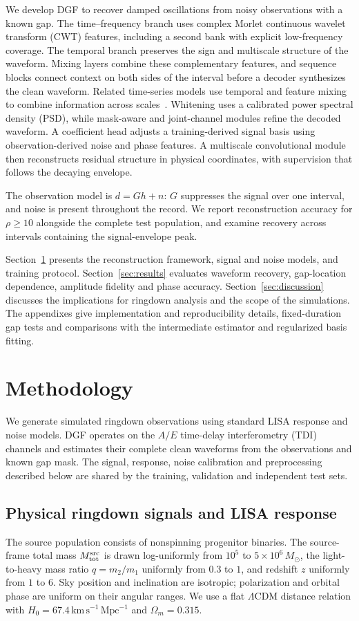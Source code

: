 \documentclass[10pt,prd,aps,a4paper,twocolumn,superscriptaddress,nofootinbib,floatfix]{revtex4-2}
\begin{document}
We develop DGF to recover damped oscillations from noisy observations with a known gap. The time--frequency branch uses complex Morlet continuous wavelet transform (CWT) features, including a second bank with explicit low-frequency coverage. The temporal branch preserves the sign and multiscale structure of the waveform. Mixing layers combine these complementary features, and sequence blocks connect context on both sides of the interval before a decoder synthesizes the clean waveform. Related time-series models use temporal and feature mixing to combine information across scales~\cite{TSMixer2023,TimeMixer2024}. Whitening uses a calibrated power spectral density (PSD), while mask-aware and joint-channel modules refine the decoded waveform. A coefficient head adjusts a training-derived signal basis using observation-derived noise and phase features. A multiscale convolutional module then reconstructs residual structure in physical coordinates, with supervision that follows the decaying envelope.

The observation model is $d=Gh+n$: $G$ suppresses the signal over one interval, and noise is present throughout the record. We report reconstruction accuracy for $\rho\ge10$ alongside the complete test population, and examine recovery across intervals containing the signal-envelope peak.

Section~\ref{sec:method} presents the reconstruction framework, signal and noise models, and training protocol. Section~\ref{sec:results} evaluates waveform recovery, gap-location dependence, amplitude fidelity and phase accuracy. Section~\ref{sec:discussion} discusses the implications for ringdown analysis and the scope of the simulations. The appendixes give implementation and reproducibility details, fixed-duration gap tests and comparisons with the intermediate estimator and regularized basis fitting.

\section{Methodology}\label{sec:method}
We generate simulated ringdown observations using standard LISA response and noise models. DGF operates on the $A/E$ time-delay interferometry (TDI) channels and estimates their complete clean waveforms from the observations and known gap mask. The signal, response, noise calibration and preprocessing described below are shared by the training, validation and independent test sets.

\subsection{Physical ringdown signals and LISA response}\label{sec:physical_signals}
The source population consists of nonspinning progenitor binaries. The source-frame total mass $M_{\rm tot}^{\rm src}$ is drawn log-uniformly from $10^5$ to $5\times10^6\,M_\odot$, the light-to-heavy mass ratio $q=m_2/m_1$ uniformly from $0.3$ to $1$, and redshift $z$ uniformly from $1$ to $6$. Sky position and inclination are isotropic; polarization and orbital phase are uniform on their angular ranges. We use a flat $\Lambda$CDM distance relation with $H_0=67.4\,\mathrm{km\,s^{-1}\,Mpc^{-1}}$ and $\Omega_m=0.315$.
\end{document}
